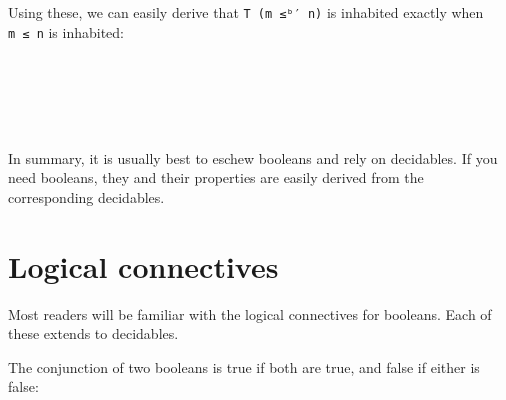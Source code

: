 Using these, we can easily derive that \texttt{T\ (m\ ≤ᵇ′\ n)} is
inhabited exactly when \texttt{m\ ≤\ n} is inhabited:

\begin{fence}
\begin{code}%
\>[0]\AgdaSpace{}%
\AgdaSymbol{:}\AgdaSpace{}%
\AgdaSpace{}%
\AgdaSymbol{\{}\AgdaSpace{}%
\AgdaSpace{}%
\AgdaSymbol{:}\AgdaSpace{}%
\AgdaSymbol{\}}\AgdaSpace{}%
\AgdaSpace{}%
\AgdaSpace{}%
\AgdaSymbol{(}\AgdaSpace{}%
\AgdaSpace{}%
\AgdaSymbol{)}\AgdaSpace{}%
\AgdaSpace{}%
\AgdaSpace{}%
\AgdaSpace{}%
\<%
\\
\>[0]%
\>[7]\AgdaSymbol{=}%
\>[10]\<%
\\
%
\\[\AgdaEmptyExtraSkip]%
\>[0]\AgdaSpace{}%
\AgdaSymbol{:}\AgdaSpace{}%
\AgdaSpace{}%
\AgdaSymbol{\{}\AgdaSpace{}%
\AgdaSpace{}%
\AgdaSymbol{:}\AgdaSpace{}%
\AgdaSymbol{\}}\AgdaSpace{}%
\AgdaSpace{}%
\AgdaSpace{}%
\AgdaSpace{}%
\AgdaSpace{}%
\AgdaSpace{}%
\AgdaSpace{}%
\AgdaSymbol{(}\AgdaSpace{}%
\AgdaSpace{}%
\AgdaSymbol{)}\<%
\\
\>[0]%
\>[7]\AgdaSymbol{=}%
\>[10]\<%
\end{code}
\end{fence}

In summary, it is usually best to eschew booleans and rely on
decidables. If you need booleans, they and their properties are easily
derived from the corresponding decidables.

\hypertarget{logical-connectives}{%
\section{Logical connectives}\label{logical-connectives}}

Most readers will be familiar with the logical connectives for booleans.
Each of these extends to decidables.

The conjunction of two booleans is true if both are true, and false if
either is false:

